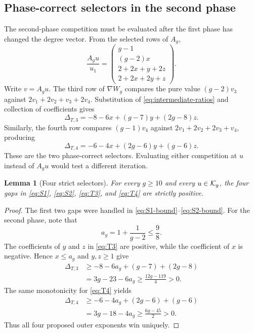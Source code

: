 \documentclass[11pt]{article}
\newtheorem{lemma}[theorem]{Lemma}
\theoremstyle{remark}
\numberwithin{equation}{section}
\begin{document}
\subsection{Phase-correct selectors in the second phase}

The second-phase competition must be evaluated after the first phase has
changed the degree vector.  From the selected rows of \(A_g\),
\begin{equation}\label{eq:intermediate-ratios}
\frac{A_gu}{u_1}=
\begin{pmatrix}
g-1\\
(g-2)x\\
2+2x+y+2z\\
2+2x+2y+z
\end{pmatrix}.
\end{equation}
Write \(v=A_gu\).  The third row of \(\nabla W_g\) compares the pure value
\((g-2)v_3\) against \(2v_1+2v_2+v_3+2v_4\).  Substitution of
\eqref{eq:intermediate-ratios} and collection of coefficients gives
\begin{equation}\label{eq:T3}
\Delta_{T,3}
=-8-6x+(g-7)y+(2g-8)z.
\end{equation}
Similarly, the fourth row compares \((g-1)v_4\) against
\(2v_1+2v_2+2v_3+v_4\), producing
\begin{equation}\label{eq:T4}
\Delta_{T,4}
=-6-4x+(2g-6)y+(g-6)z.
\end{equation}
These are the two phase-correct selectors.  Evaluating either competition
at \(u\) instead of \(A_gu\) would test a different iteration.

\begin{lemma}[Four strict selectors]\label{lem:selectors}
For every \(g\geq10\) and every \(u\in\mathcal{K}_g\), the four gaps in
\eqref{eq:S1}, \eqref{eq:S2}, \eqref{eq:T3}, and \eqref{eq:T4} are strictly
positive.
\end{lemma}

\begin{proof}
The first two gaps were handled in
\eqref{eq:S1-bound}--\eqref{eq:S2-bound}.  For the second phase, note that
\[
a_g=1+\frac{1}{g-2}\leq\frac98.
\]
The coefficients of \(y\) and \(z\) in \eqref{eq:T3} are positive, while
the coefficient of \(x\) is negative.  Hence \(x\leq a_g\) and
\(y,z\geq1\) give
\begin{equation}\label{eq:T3-bound}
\begin{aligned}
\Delta_{T,3}
&\geq-8-6a_g+(g-7)+(2g-8)\\
&=3g-23-6a_g
\geq\frac{12g-119}{4}>0.
\end{aligned}
\end{equation}
The same monotonicity for \eqref{eq:T4} yields
\begin{equation}\label{eq:T4-bound}
\begin{aligned}
\Delta_{T,4}
&\geq-6-4a_g+(2g-6)+(g-6)\\
&=3g-18-4a_g
\geq\frac{6g-45}{2}>0.
\end{aligned}
\end{equation}
Thus all four proposed outer exponents win uniquely.
\end{proof}
\end{document}

